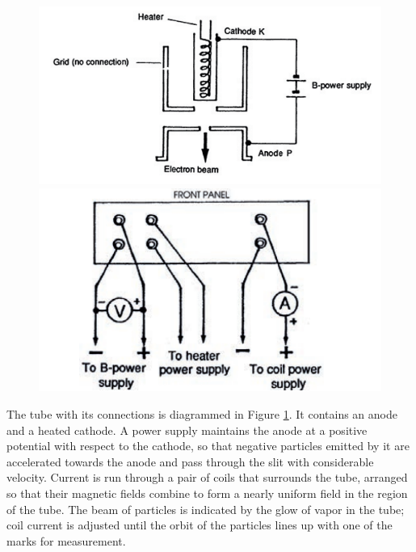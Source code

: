 \begin{figure}[htp]
    \centering
    \begin{minipage}{0.5\textwidth}
        \centering
        \includegraphics[width=\textwidth]{images/02_thomson/gun.png} %
    \end{minipage}\hfill
    \begin{minipage}{0.5\textwidth}
        \centering
        \includegraphics[width=\textwidth]{images/02_thomson/power-supply.png} %
    \end{minipage}
    \caption{}
    \label{fig:thomson_4}
\end{figure}


The tube with its connections is diagrammed in Figure \ref{fig:thomson_4}. It contains
an anode and a heated cathode. A power supply maintains the anode at a positive
potential with respect to the cathode, so that negative particles emitted
by it are accelerated towards the anode and pass through the slit with
considerable velocity. Current is run through a pair of coils that surrounds the tube, arranged so that 
their magnetic fields combine to form a nearly uniform field in the region of the tube. The beam of 
particles is indicated by the glow of vapor in the tube; coil current is adjusted until 
the orbit of the particles lines up with one of the marks for measurement.

